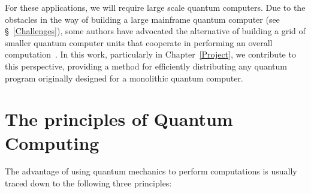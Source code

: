 For these applications, we will require large scale quantum computers. Due to the obstacles in the way of building a large mainframe quantum computer (see \S~\ref{Challenges}), some authors have advocated the alternative of building a grid of smaller quantum computer units that cooperate in performing an overall computation~\cite{DistributedQCHW}. In this work, particularly in Chapter~\ref{Project}, we contribute to this perspective, providing a method for efficiently distributing any quantum program originally designed for a monolithic quantum computer.

\section{The principles of Quantum Computing}
\label{Principles}

The advantage of using quantum mechanics to perform computations is usually traced down to the following three principles:


